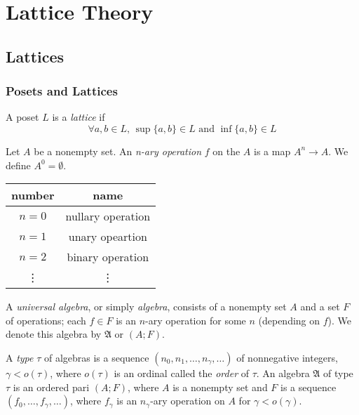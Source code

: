 \part{Lattice Theory}

\chapter{Lattices}

\section{Posets and Lattices}

\begin{definition}
    A poset \(L\) is a \emph{lattice} if
    \[\forall a,b \in L,\, \sup\{a,b\} \in L \mbox{ and } \inf\{a,b\} \in L\]
\end{definition}

\begin{definition}
    Let \(A\) be a nonempty set. An \emph{n-ary operation} \(f\) on the \(A\) is a map \(A^n \to A\). We define \(A^0=\emptyset\).
    \begin{center}
        \begin{tabular}{|c|c|}
            \hline
            number & name \\
            \hline
            \(n=0\) & nullary operation \\
            \(n=1\) & unary opeartion \\
            \(n=2\) & binary operation \\
            \vdots & \vdots \\
            \hline
        \end{tabular}
    \end{center}
\end{definition}

\begin{definition}
    A \emph{universal algebra}, or simply \emph{algebra}, consists of a nonempty set \(A\) and a set \(F\) of operations; each \(f \in F\) is an \(n\)-ary operation for some \(n\) (depending on \(f\)). We denote this algebra by \(\mathfrak{A}\) or \((A;F)\).
\end{definition}

A \emph{type} \(\tau\) of algebras is a sequence \((n_0,n_1,\dots,n_\gamma,\dots)\) of nonnegative integers, \(\gamma<o(\tau)\), where \(o(\tau)\) is an ordinal called the \emph{order} of \(\tau\). An algebra \(\mathfrak{A} \) of type \(\tau\) is an ordered pari \((A;F)\), where \(A\) is a nonempty set and \(F\) is a sequence \((f_0,\dots,f_\gamma,\dots)\), where \(f_\gamma\) is an \(n_\gamma\)-ary operation on \(A\) for \(\gamma < o(\gamma)\).

